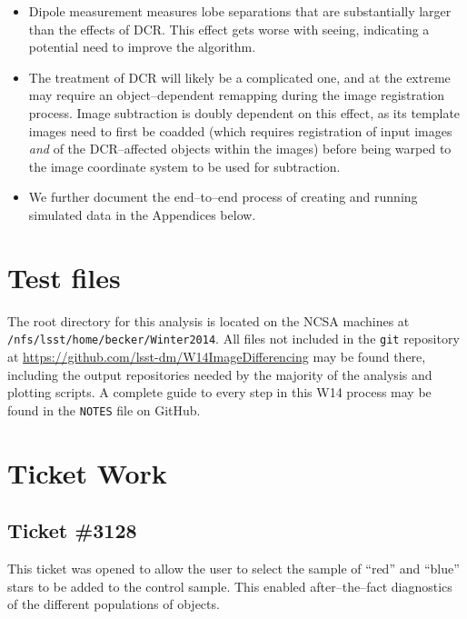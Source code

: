 \documentclass[DM,toc]{lsstdoc}
\begin{document}
\begin{itemize}
\item Dipole measurement measures lobe separations that are
  substantially larger than the effects of DCR.  This effect gets
  worse with seeing, indicating a potential need to improve the
  algorithm.

\item The treatment of DCR will likely be a complicated one, and at
  the extreme may require an object--dependent remapping during the
  image registration process.  Image subtraction is doubly dependent
  on this effect, as its template images need to first be coadded
  (which requires registration of input images {\it and} of the
  DCR--affected objects within the images) before being warped to the
  image coordinate system to be used for subtraction.

\item We further document the end--to--end process of creating and
  running simulated data in the Appendices below.

\end{itemize}



\appendix

\section{Test files}

The root directory for this analysis is located on the NCSA machines
at \\{\tt /nfs/lsst/home/becker/Winter2014}.  All files not included in
the \texttt{git} repository at \url{https://github.com/lsst-dm/W14ImageDifferencing} may be found there, including the output
repositories needed by the majority of the analysis and plotting
scripts.  A complete guide to every step in this W14 process may be
found in the {\tt NOTES} file on GitHub.

\section{Ticket Work}

\subsection{Ticket \#3128 \label{sec:3128}}

This ticket was opened to allow the user to select the sample of
``red'' and ``blue'' stars to be added to the control sample.  This
enabled after--the--fact diagnostics of the different populations of
objects.
\end{document}
